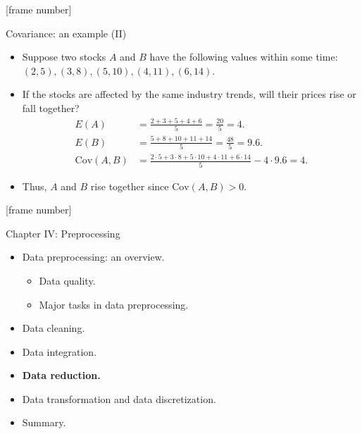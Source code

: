 \documentclass[aspectratio=169,t]{beamer}
\begin{document}
  {
    [frame number]
    \begin{frame}{Covariance: an example (II)}
    \begin{itemize}
      \item Suppose two stocks $A$ and $B$ have the following values within some time:\\
      $(2,5), (3,8), (5,10), (4,11), (6,14).$
      \item If the stocks are affected by the same industry trends, will their prices rise or fall together?
      \begin{align}
        E(A) &= \frac{2+3+5+4+6}{5} = \frac{20}{5} = 4.\\
        E(B) &= \frac{5+8+10+11+14}{5} = \frac{48}{5} = 9.6.\\
        \text{Cov}(A,B) &= \frac{2\cdot5 + 3\cdot 8 + 5 \cdot 10 + 4 \cdot 11 + 6 \cdot 14}{5} - 4\cdot 9.6 = 4.
      \end{align}
      \item Thus, $A$ and $B$ rise together since $\text{Cov}(A,B) > 0$.
    \end{itemize}
    \end{frame}
  }

  {
    [frame number]
    \begin{frame}{Chapter IV: Preprocessing}
        \begin{itemize}
            \item Data preprocessing: an overview.
            \begin{itemize}
              \item Data quality.
              \item Major tasks in data preprocessing.
            \end{itemize}
            \item Data cleaning.
            \item Data integration.
            \item \textbf{Data reduction.}
            \item Data transformation and data discretization.
            \item Summary.
        \end{itemize}
    \end{frame}
  }
\end{document}
